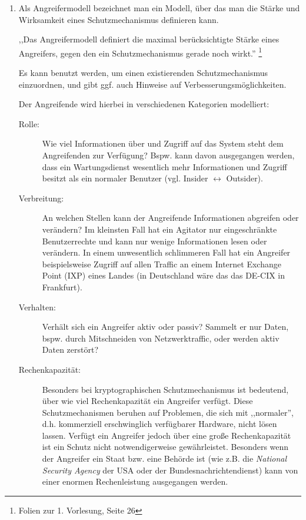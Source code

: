 \documentclass[a4paper,11pt]{scrartcl}
\begin{document}
\begin{enumerate}[1.]
    \item
        Als Angreifermodell bezeichnet man ein Modell, über das man die
        Stärke und Wirksamkeit eines Schutzmechanismus definieren kann.

        \begin{displayquote}
            ,,Das Angreifermodell definiert die maximal berücksichtigte Stärke eines
            Angreifers, gegen den ein Schutzmechanismus gerade noch wirkt.''%
            \footnote{Folien zur 1. Vorlesung, Seite 26}
        \end{displayquote}

        Es kann benutzt werden, um einen existierenden Schutzmechanismus
        einzuordnen, und gibt ggf. auch Hinweise auf
        Verbesserungsmöglichkeiten.

        Der Angreifende wird hierbei in verschiedenen Kategorien modelliert:

        \begin{description}
            \item[Rolle:]
                Wie viel Informationen über und Zugriff auf das System steht dem
                Angreifenden zur Verfügung? Bspw. kann davon ausgegangen werden,
                dass ein Wartungsdienst wesentlich mehr Informationen und
                Zugriff besitzt als ein normaler Benutzer (vgl. Insider $\leftrightarrow$ Outsider).
            \item[Verbreitung:]
                An welchen Stellen kann der Angreifende Informationen abgreifen
                oder verändern? Im kleinsten Fall hat ein Agitator nur
                eingeschränkte Benutzerrechte und kann nur wenige Informationen
                lesen oder verändern. In einem unwesentlich schlimmeren Fall
                hat ein Angreifer beispielsweise Zugriff auf allen Traffic an
                einem Internet Exchange Point (IXP) eines Landes (in Deutschland
                wäre das das DE-CIX in Frankfurt).
            \item[Verhalten:]
                Verhält sich ein Angreifer aktiv oder passiv? Sammelt er nur
                Daten, bspw. durch Mitschneiden von Netzwerktraffic, oder werden
                aktiv Daten zerstört?
            \item[Rechenkapazität:]
                Besonders bei kryptographischen Schutzmechanismus ist bedeutend,
                über wie viel Rechenkapazität ein Angreifer verfügt. Diese
                Schutzmechanismen beruhen auf Problemen, die sich mit ,,normaler'',
                d.h. kommerziell erschwinglich verfügbarer Hardware,  nicht
                lösen lassen. Verfügt ein Angreifer jedoch über eine große
                Rechenkapazität ist ein Schutz nicht notwendigerweise gewährleistet.
                Besonders wenn der Angreifer ein Staat bzw. eine Behörde ist
                (wie z.B. die \textit{National Security Agency} der USA oder der
                Bundesnachrichtendienst) kann von einer enormen Rechenleistung
                ausgegangen werden.
         \end{description}


\end{enumerate}
\end{document}
